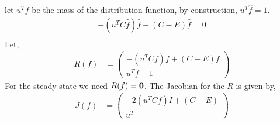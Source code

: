 \documentclass{article}[draft]
\begin{document}
let $u^T f$ be the mass of the distribution function, by construction, $u^T \hat{f}=1$.
\begin{align*}
-(u^T C \hat{f}) \hat{f} + (C-E)\hat{f} =0 \\ 
\end{align*} 
Let, 
\begin{align*}
R(f)&=
\begin{pmatrix}
-(u^T C f) f + (C-E)f \\
u^Tf-1
\end{pmatrix}
\end{align*} For the steady  state we need $R(f) = \mathbf{0}$. The Jacobian for the $R$ is given by, 
\begin{align*}
J(f)&=
\begin{pmatrix}
-2(u^T C f) I + (C-E) \\
u^T
\end{pmatrix}
\end{align*}
\end{document}
